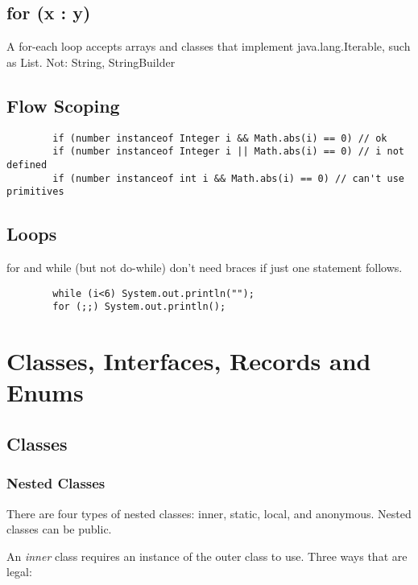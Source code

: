 \documentclass{scrartcl}
\begin{document}
\subsection{ for (x : y)}

     A for-­each loop accepts arrays and classes that implement java.lang.Iterable, such as List. Not: String, StringBuilder

\subsection{Flow Scoping}

    \begin{lstlisting}
        if (number instanceof Integer i && Math.abs(i) == 0) // ok
        if (number instanceof Integer i || Math.abs(i) == 0) // i not defined
        if (number instanceof int i && Math.abs(i) == 0) // can't use primitives
    \end{lstlisting}

\subsection{Loops}

    for and while (but not do-while) don't need braces if just one statement follows.

    \begin{lstlisting}
        while (i<6) System.out.println("");
        for (;;) System.out.println();
    \end{lstlisting}

\section{Classes, Interfaces, Records and Enums}
\subsection{Classes}
\subsubsection{Nested Classes}

    There are four types of nested classes: inner, static, local, and anonymous.
    Nested classes can be public.

    An \textit{inner} class requires an instance of the outer class to use.
    Three ways that are legal:
\end{document}
